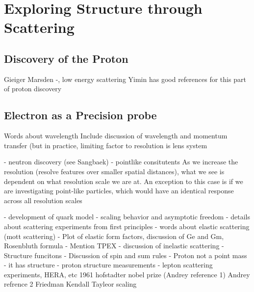 \section{Exploring Structure through Scattering}\label{ch1:sec1:background}

    \subsection{Discovery of the Proton}
        Gieiger Marsden -, low energy scattering
        Yimin has good references for this part of proton discovery
    
    \subsection{Electron as a Precision probe}
        Words about wavelength
        Include discussion of wavelength and momentum transfer (but in practice, limiting factor to resolution is lens system %
        
    - neutron discovery (see Sangbaek)
    - pointlike consitutents
    As we increase the resolution (resolve features over smaller spatial distances), what we see is dependent on what resolution scale we are at. An exception to this case is if we are investigating point-like particles, which would have an identical response across all resolution scales

    - development of quark model
    - scaling behavior and asymptotic freedom
    - details about scattering experiments from first principles
    - words about elastic scattering (mott scattering)
    - Plot of elastic form factors, discussion of Ge and Gm, Rosenbluth formula
    - Mention TPEX
    - discussion of inelastic scattering
    - Structure funcitons
    - Discussion of spin and sum rules
    - Proton not a point mass - it has structure
    - proton structure measurements
    - lepton scattering experiments, HERA, etc
    1961 hofstadter nobel prize (Andrey reference 1)
    Andrey refrence 2 Friedman Kendall Tayleor scaling
    
    













